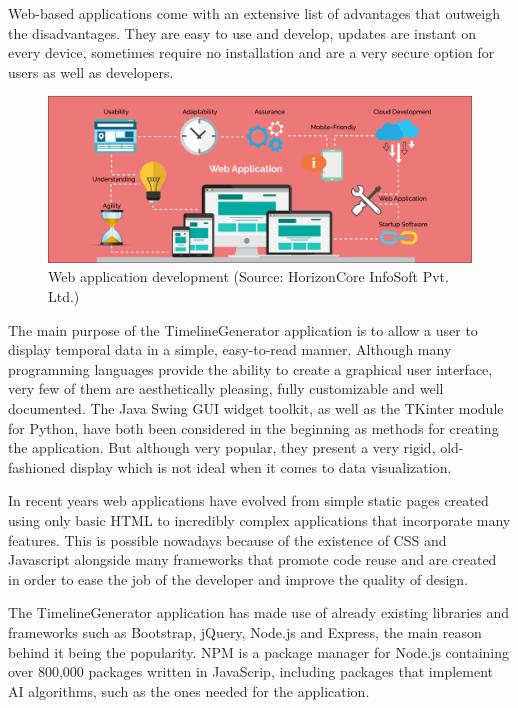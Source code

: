 \documentclass{report}
\begin{document}
Web-based applications come with an extensive list of advantages that outweigh the disadvantages. They are easy to use and develop, updates are instant on every device, sometimes require no installation and are a very secure option for users as well as developers. \par

\begin{figure}[b]
\vspace*{-1cm}
\centerline{\includegraphics[scale=0.1]{webapp}}
\caption{Web application development (Source: HorizonCore InfoSoft Pvt. Ltd.)}
\end{figure}

The main purpose of the TimelineGenerator application is to allow a user to display temporal data in a simple, easy-to-read manner. Although many programming languages provide the ability to create a graphical user interface, very few of them are aesthetically pleasing, fully customizable and well documented. The Java Swing GUI widget toolkit, as well as the TKinter module for Python, have both been considered in the beginning as methods for creating the application. But although very popular, they present a very rigid, old-fashioned display which is not ideal when it comes to data visualization. \par

In recent years web applications have evolved from simple static pages created using only basic HTML to incredibly complex applications that incorporate many features. This is possible nowadays because of the existence of CSS and Javascript alongside many frameworks that promote code reuse and are created in order to ease the job of the developer and improve the quality of design. \par

The TimelineGenerator application has made use of already existing libraries and frameworks such as Bootstrap, jQuery, Node.js and Express, the main reason behind it being the popularity. NPM is a package manager for Node.js containing over 800,000 packages written in JavaScrip, including packages that implement AI algorithms, such as the ones needed for the application.
\end{document}
